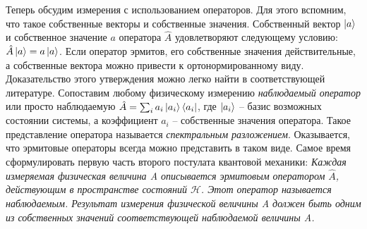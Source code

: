 Теперь обсудим измерения с использованием операторов. Для этого вспомним, что такое собственные векторы и собственные значения. Собственный вектор $\ket{a}$ и собственное значение $a$ оператора $\hat{A}$ удовлетворяют следующему условию: $\hat{A}\ket{a} = a\ket{a}$. Если оператор эрмитов, его собственные значения действительные, а собственные вектора можно привести к ортонормированному виду. Доказательство этого утверждения можно легко найти в соответствующей литературе. Сопоставим любому физическому измерению \textit{наблюдаемый оператор} или просто наблюдаемую $\hat{A} = \sum_i a_i \ket{a_i}\bra{a_i}$, где  $\ket{a_i}$ -- базис возможных состоянии системы, а коэффициент $a_i$ -- собственные значения оператора. Такое представление оператора называется \textit{спектральным разложением}. Оказывается, что эрмитовые операторы всегда можно представить в таком виде. Самое время сформулировать первую часть второго постулата квантовой механики: \textit{Каждая измеряемая физическая величина A описывается эрмитовым оператором $\hat{A}$, действующим в пространстве состояний $\mathcal{H}$. Этот оператор называется наблюдаемым. Результат измерения физической величины A должен быть одним из собственных значений соответствующей наблюдаемой величины A.}


